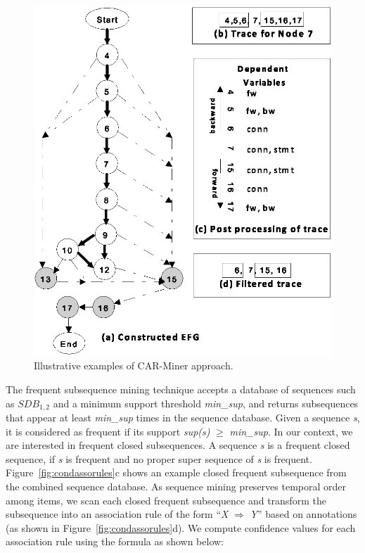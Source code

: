 \begin{figure}[t]
\centering
\includegraphics[scale=0.70,clip]{figs/forexamplesec1.eps}\vspace*{-2ex}
\caption{\label{fig:approchex} Illustrative examples of CAR-Miner approach.} \vspace*{-5ex}
\end{figure}

The frequent subsequence mining technique accepts a database of sequences such as $SDB_{1,2}$ and a minimum
support threshold \emph{min\_sup}, and returns subsequences that appear
at least \emph{min\_sup} times in the sequence database. 
Given a sequence \emph{s}, it is considered as frequent if
its support \emph{sup(s)} $\geq$ \emph{min\_sup}.
In our context, we are interested in frequent closed subsequences. A sequence \emph{s}
is a frequent closed sequence, if \emph{s} is frequent 
and no proper super sequence of \emph{s} is frequent. 
Figure~\ref{fig:condassorules}c shows an example 
closed frequent subsequence from the combined sequence database.
As sequence mining preserves temporal order among items, we
scan each closed frequent subsequence and transform the subsequence into an association rule
of the form ``\emph{X} $\Rightarrow$ \emph{Y}'' based on 
annotations (as shown in Figure~\ref{fig:condassorules}d).
We compute confidence values for each association rule  
using the formula as shown below:


